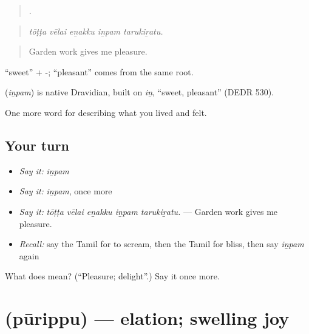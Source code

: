 \begin{quote}
    .
\end{quote}

\begin{quote}
\emph{tōṭṭa vēlai eṉakku iṉpam tarukiṟatu.}
\end{quote}

\begin{quote}
Garden work gives me pleasure.
\end{quote}

 \textquotedblleft{}sweet\textquotedblright{} + -;  \textquotedblleft{}pleasant\textquotedblright{} comes from the same root.

\begin{cousinweb}
\textbf{} (\emph{iṉpam}) is native Dravidian, built on  \emph{iṉ}, \textquotedblleft{}sweet, pleasant\textquotedblright{} (DEDR 530).
\end{cousinweb}

\begin{grammarlens}[title={What you've built}]
One more word for describing what you lived and felt.
\end{grammarlens}

\subsection*{Your turn}
\begin{itemize}
\raggedright
  \item \emph{Say it:} \emph{iṉpam}
  \item \emph{Say it:} \emph{iṉpam}, once more
  \item \emph{Say it:} \emph{tōṭṭa vēlai eṉakku iṉpam tarukiṟatu.} — Garden work gives me pleasure.
  \item \emph{Recall:} say the Tamil for to scream, then the Tamil for bliss, then say \emph{iṉpam} again
\end{itemize}

\begin{tcolorbox}[breakable,colback=teal!4,colframe=teal!35!black,title={Before you move on}]
What does  mean? (\textquotedblleft{}Pleasure; delight\textquotedblright{}.) Say it once more.
\end{tcolorbox}
\section[\texorpdfstring{\ta{பூரிப்பு} (pūrippu)}{பூரிப்பு (pūrippu)}]{ (pūrippu) — elation; swelling joy}

